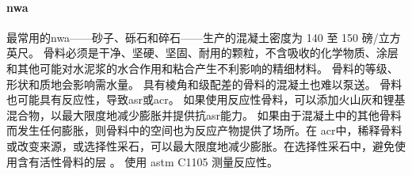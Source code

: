 \paragraph{\acrfull*{nwa}}
最常用的\acrlong*{nwa}——砂子、砾石和碎石——生产的混凝土密度为 140 至 150 磅/立方英尺。 骨料必须是干净、坚硬、坚固、耐用的颗粒，不含吸收的化学物质、涂层和其他可能对水泥浆的水合作用和粘合产生不利影响的精细材料\cite{kosmatka2011d}。 骨料的等级、形状和质地会影响需水量。 具有棱角和级配差的骨料的混凝土也难以泵送。 骨料也可能具有反应性，导致\acrlong*{asr}或\acrfull*{acr}。 如果使用反应性骨料，可以添加火山灰和锂基混合物，以最大限度地减少膨胀并提供抗\acrlong*{asr}能力。 如果由于混凝土中的其他骨料而发生任何膨胀，则骨料中的空间也为反应产物提供了场所。在 \acrlong*{acr}中，稀释骨料或改变来源，或选择性采石，可以最大限度地减少膨胀。在选择性采石中，避免使用含有活性骨料的层 \cite{ozol1994a}。 使用 \acrshort*{astm} C1105 测量反应性。

